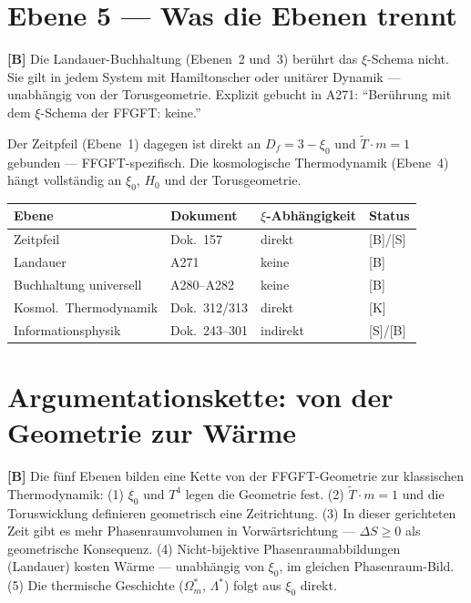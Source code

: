 \section{Ebene 5 --- Was die Ebenen trennt}

\textbf{[B]} Die Landauer-Buchhaltung (Ebenen~2 und~3) berührt das
$\xi$-Schema nicht. Sie gilt in jedem System mit Hamiltonscher oder
unitärer Dynamik --- unabhängig von der Torusgeometrie. Explizit
gebucht in A271: \enquote{Berührung mit dem $\xi$-Schema der FFGFT:
keine.}

Der Zeitpfeil (Ebene~1) dagegen ist direkt an $D_f = 3-\xi_0$ und
$\tilde{T} \cdot m = 1$ gebunden --- FFGFT-spezifisch.
Die kosmologische Thermodynamik (Ebene~4) hängt vollständig an
$\xi_0$, $H_0$ und der Torusgeometrie.

\begin{center}
\small
\begin{tabular}{@{}p{}p{}p{}p{}@{}}
\toprule
\textbf{Ebene} & \textbf{Dokument} & \textbf{$\xi$-Abhängigkeit} & \textbf{Status} \\
\midrule
Zeitpfeil & Dok.~157 & direkt & [B]/[S] \\
Landauer & A271 & keine & [B] \\
Buchhaltung universell & A280--A282 & keine & [B] \\
Kosmol.\ Thermodynamik & Dok.~312/313 & direkt & [K] \\
Informationsphysik & Dok.~243--301 & indirekt & [S]/[B] \\
\bottomrule
\end{tabular}
\end{center}

\section{Argumentationskette: von der Geometrie zur Wärme}

\textbf{[B]} Die fünf Ebenen bilden eine Kette von der FFGFT-Geometrie
zur klassischen Thermodynamik:
(1) $\xi_0$ und $T^4$ legen die Geometrie fest.
(2) $\tilde{T} \cdot m = 1$ und die Toruswicklung definieren
geometrisch eine Zeitrichtung.
(3) In dieser gerichteten Zeit gibt es mehr Phasenraumvolumen in
Vorwärtsrichtung --- $\Delta S \ge 0$ als geometrische Konsequenz.
(4) Nicht-bijektive Phasenraumabbildungen (Landauer) kosten Wärme ---
unabhängig von $\xi_0$, im gleichen Phasenraum-Bild.
(5) Die thermische Geschichte ($\Omega_m^*$, $\Lambda^*$) folgt aus
$\xi_0$ direkt.

